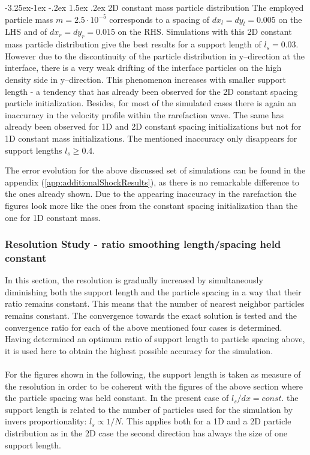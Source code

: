\documentclass[11pt,a4paper,twoside]{report}
\makeatletter
\renewcommand\paragraph{\@startsection{paragraph}{4}{\z@}%
  {-3.25ex\@plus -1ex \@minus -.2ex}%
  {1.5ex \@plus .2ex}%
  {\normalfont\normalsize\bfseries}}
\makeatother
\begin{document}
\paragraph{2D constant mass particle distribution}
The employed particle mass $m=2.5\cdot10^{-5}$ corresponds to a spacing of $dx_l=dy_l=0.005$ on the LHS and of $dx_r=dy_r=0.015$ on the RHS.
Simulations with this 2D constant mass particle distribution give the best results for a support length of $l_s=0.03$. However due to the discontinuity of the particle distribution in y--direction at the interface, there is a very weak drifting of the interface particles on the high density side in y--direction. This phenomenon increases with smaller support length - a tendency that has already been observed for the 2D constant spacing particle initialization. 
Besides, for most of the simulated cases there is again an inaccuracy in the velocity profile  within the rarefaction wave. The same has already been observed for 1D and 2D constant spacing initializations but not for 1D constant mass initializations.
The mentioned inaccuracy only disappears for support lengths  $l_s\geq0.4$.

The error evolution for the above discussed set of simulations can be found in the appendix (\ref{app:additionalShockResults}), as there is no remarkable difference to the ones already shown. Due to the appearing inaccuracy in the rarefaction the figures look more like the ones from the constant spacing initialization than the one for 1D constant mass. 



\subsubsection{Resolution Study - ratio smoothing length/spacing held constant}
In this section, the resolution is gradually increased by simultaneously diminishing both the support length and the particle spacing in a way that their ratio remains constant. This means that the number of nearest neighbor particles remains constant. 
The convergence towards the exact solution is tested and the convergence ratio for each of the above mentioned four cases is determined. Having determined an optimum ratio of support length to particle spacing above, it is used here to obtain the highest possible accuracy for the simulation. \\
\\
\indent
For the figures shown in the following, the support length is taken as measure of the resolution in order to be coherent with the figures of the above section where the particle spacing was held constant. In the present case of $l_s/dx=const.$ the support length is related to the number of particles used for the simulation by invers proportionality: $l_s\propto1/N$. This applies both for a 1D and a 2D particle distribution as in the 2D case the second direction has always the size of one support length.
\end{document}
